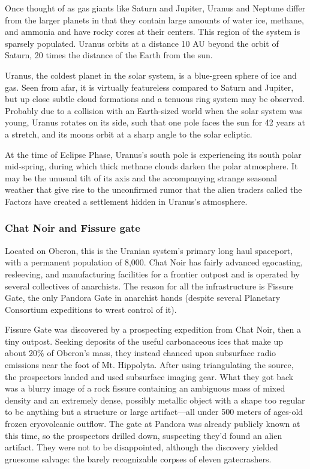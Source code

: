 Once thought of as gas giants like Saturn and Jupiter, Uranus and Neptune differ from the larger planets in that they contain large amounts of water ice, methane, and ammonia and have rocky cores at their centers. This region of the system is sparsely populated. Uranus orbits at a distance 10 AU beyond the orbit of Saturn, 20 times the distance of the Earth from the sun. 

Uranus, the coldest planet in the solar system, is a blue-green sphere of ice and gas. Seen from afar, it is virtually featureless compared to Saturn and Jupiter, but up close subtle cloud formations and a tenuous ring system may be observed. Probably due to a collision with an Earth-sized world when the solar system was young, Uranus rotates on its side, such that one pole faces the sun for 42 years at a stretch, and its moons orbit at a sharp angle to the solar ecliptic. 

At the time of Eclipse Phase, Uranus's south pole is experiencing its south polar mid-spring, during which thick methane clouds darken the polar atmosphere. It may be the unusual tilt of its axis and the accompanying strange seasonal weather that give rise to the unconfirmed rumor that the alien traders called the Factors have created a settlement hidden in Uranus's atmosphere. 

\subsubsection{Chat Noir and Fissure gate} \label{sec:chat-noir-fissure} 

Located on Oberon, this is the Uranian system's primary long haul spaceport, with a permanent population of 8,000. Chat Noir has fairly advanced egocasting, resleeving, and manufacturing facilities for a frontier outpost and is operated by several collectives of anarchists. The reason for all the infrastructure is Fissure Gate, the only Pandora Gate in anarchist hands (despite several Planetary Consortium expeditions to wrest control of it). 

Fissure Gate was discovered by a prospecting expedition from Chat Noir, then a tiny outpost. Seeking deposits of the useful carbonaceous ices that make up about 20\% of Oberon's mass, they instead chanced upon subsurface radio emissions near the foot of Mt. Hippolyta. After using triangulating the source, the prospectors landed and used subsurface imaging gear. What they got back was a blurry image of a rock fissure containing an ambiguous mass of mixed density and an extremely dense, possibly metallic object with a shape too regular to be anything but a structure or large artifact—all under 500 meters of ages-old frozen cryovolcanic outflow. The gate at Pandora was already publicly known at this time, so the prospectors drilled down, suspecting they'd found an alien artifact. They were not to be disappointed, although the discovery yielded gruesome salvage: the barely recognizable corpses of eleven gatecrashers. 

